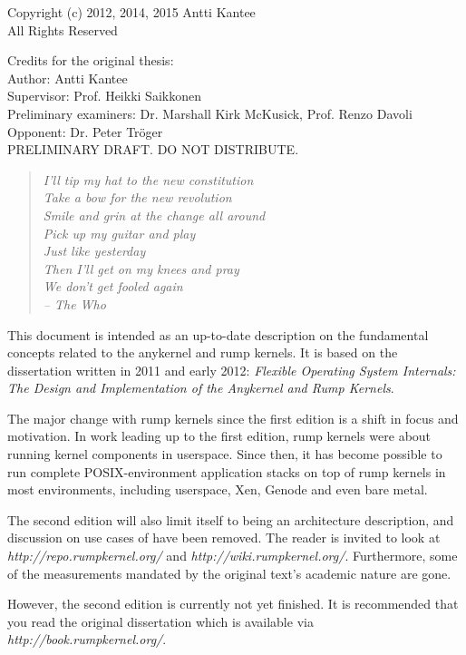 \documentclass[openright]{tkkdiss}
\begin{document}


\cleardoublepage

Copyright (c) 2012, 2014, 2015 Antti Kantee\\
All Rights Reserved

Credits for the original thesis: \\
Author: Antti Kantee \\
Supervisor: Prof. Heikki Saikkonen \\
Preliminary examiners: Dr. Marshall Kirk McKusick, Prof. Renzo Davoli \\
Opponent: Dr. Peter Tr\"{o}ger \\

{\large PRELIMINARY DRAFT.  DO NOT DISTRIBUTE.}

\begin{preface}

\begin{verse}
\textit{I'll tip my hat to the new constitution\\
Take a bow for the new revolution\\
Smile and grin at the change all around\\
Pick up my guitar and play\\
Just like yesterday\\
Then I'll get on my knees and pray\\
We don't get fooled again\\
-- The Who}
\end{verse}

This document is intended as an up-to-date description on the fundamental
concepts related to the anykernel and rump kernels.  It is based on the
dissertation written in 2011 and early 2012: \textit{Flexible
Operating System Internals: The Design and Implementation of the Anykernel
and Rump Kernels}.

The major change with rump kernels since the first edition is a shift
in focus and motivation.  In work leading up to the first edition, rump
kernels were about running kernel components in userspace.  Since then,
it has become possible to run complete POSIX-environment application
stacks on top of rump kernels in most environments, including userspace,
Xen, Genode and even bare metal.

The second edition will also limit itself to being an architecture
description, and discussion on use cases of have been removed.  The reader
is invited to look at \textit{http://repo.rumpkernel.org/} and
\textit{http://wiki.rumpkernel.org/}.  Furthermore, some of the
measurements mandated by the original text's academic nature are gone.

However, the second edition is currently not yet finished.  It is
recommended that you read the original dissertation which is available
via \textit{http://book.rumpkernel.org/}.

\end{preface}


\tableofcontents


\begin{listofabbreviations}

\printnomenclature[5cm]

\end{listofabbreviations}


\listoffigures
\listoftables







\end{document}
